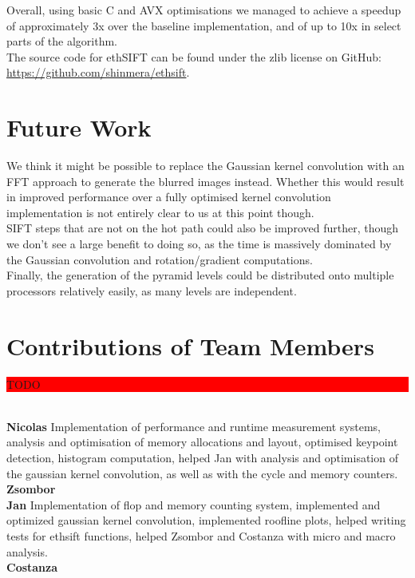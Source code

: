 \documentclass[letterpaper]{article}
\begin{document}
Overall, using basic C and AVX optimisations we managed to achieve a speedup of approximately 3x over the baseline implementation, and of up to 10x in select parts of the algorithm. \\

The source code for ethSIFT can be found under the zlib license on GitHub: \\\url{https://github.com/shinmera/ethsift}.

\section{Future Work}
We think it might be possible to replace the Gaussian kernel convolution with an FFT approach to generate the blurred images instead. Whether this would result in improved performance over a fully optimised kernel convolution implementation is not entirely clear to us at this point though. \\

SIFT steps that are not on the hot path could also be improved further, though we don't see a large benefit to doing so, as the time is massively dominated by the Gaussian convolution and rotation/gradient computations. \\

Finally, the generation of the pyramid levels could be distributed onto multiple processors relatively easily, as many levels are independent. \\

\section{Contributions of Team Members}
\colorbox{red}{\parbox{0.45\textwidth}{TODO}} \\

\textbf{Nicolas} Implementation of performance and runtime measurement systems, analysis and optimisation of memory allocations and layout, optimised keypoint detection, histogram computation, helped Jan with analysis and optimisation of the gaussian kernel convolution, as well as with the cycle and memory counters. \\

\textbf{Zsombor} \\

\textbf{Jan} Implementation of flop and memory counting system, implemented and optimized gaussian kernel convolution, implemented roofline plots, helped writing tests for ethsift functions, helped Zsombor and Costanza with micro and macro analysis. \\

\textbf{Costanza} \\


\end{document}
